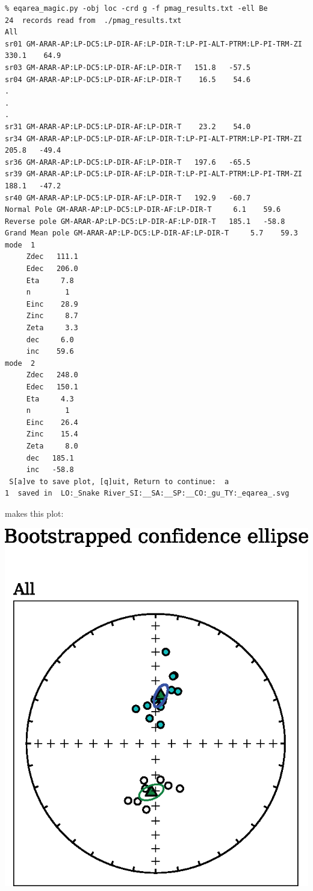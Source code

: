 \documentclass[11pt]{book}
\begin{document}
{{{\begin{verbatim}
% eqarea_magic.py -obj loc -crd g -f pmag_results.txt -ell Be
24  records read from  ./pmag_results.txt
All
sr01 GM-ARAR-AP:LP-DC5:LP-DIR-AF:LP-DIR-T:LP-PI-ALT-PTRM:LP-PI-TRM-ZI   330.1    64.9
sr03 GM-ARAR-AP:LP-DC5:LP-DIR-AF:LP-DIR-T   151.8   -57.5
sr04 GM-ARAR-AP:LP-DC5:LP-DIR-AF:LP-DIR-T    16.5    54.6
.
.
.
sr31 GM-ARAR-AP:LP-DC5:LP-DIR-AF:LP-DIR-T    23.2    54.0
sr34 GM-ARAR-AP:LP-DC5:LP-DIR-AF:LP-DIR-T:LP-PI-ALT-PTRM:LP-PI-TRM-ZI   205.8   -49.4
sr36 GM-ARAR-AP:LP-DC5:LP-DIR-AF:LP-DIR-T   197.6   -65.5
sr39 GM-ARAR-AP:LP-DC5:LP-DIR-AF:LP-DIR-T:LP-PI-ALT-PTRM:LP-PI-TRM-ZI   188.1   -47.2
sr40 GM-ARAR-AP:LP-DC5:LP-DIR-AF:LP-DIR-T   192.9   -60.7
Normal Pole GM-ARAR-AP:LP-DC5:LP-DIR-AF:LP-DIR-T     6.1    59.6
Reverse pole GM-ARAR-AP:LP-DC5:LP-DIR-AF:LP-DIR-T   185.1   -58.8
Grand Mean pole GM-ARAR-AP:LP-DC5:LP-DIR-AF:LP-DIR-T     5.7    59.3
mode  1
     Zdec   111.1
     Edec   206.0
     Eta     7.8
     n        1
     Einc    28.9
     Zinc     8.7
     Zeta     3.3
     dec     6.0
     inc    59.6
mode  2
     Zdec   248.0
     Edec   150.1
     Eta     4.3
     n        1
     Einc    26.4
     Zinc    15.4
     Zeta     8.0
     dec   185.1
     inc   -58.8
 S[a]ve to save plot, [q]uit, Return to continue:  a
1  saved in  LO:_Snake River_SI:__SA:__SP:__CO:_gu_TY:_eqarea_.svg
\end{verbatim}

\noindent makes this plot:

{%
 \includegraphics[width=12 cm]{EPSfiles/eqarea-magic.eps}}

}}}
\end{document}
